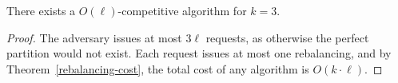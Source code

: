 \begin{theorem}
  There exists a $O(\ell)$-competitive algorithm for $k=3$.
\end{theorem}

\begin{proof}
  The adversary issues at most $3\ell$ requests, as otherwise the perfect partition would not exist. Each request issues at most one rebalancing, and by Theorem~\ref{rebalancing-cost}, the total cost of any algorithm is $O(k\cdot \ell)$.
\end{proof}